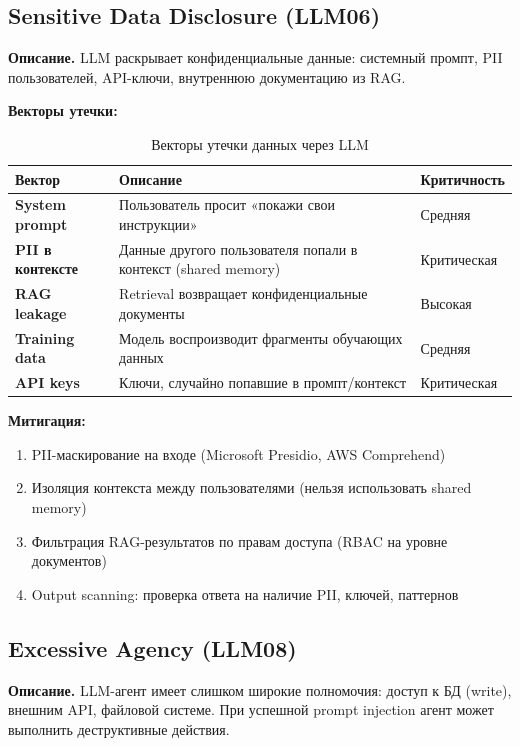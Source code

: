 \documentclass[12pt,a4paper]{article}
\begin{document}
\subsection{Sensitive Data Disclosure (LLM06)}

\textbf{Описание.} LLM раскрывает конфиденциальные данные: системный промпт, PII пользователей, API-ключи, внутреннюю документацию из RAG.

\textbf{Векторы утечки:}

\begin{table}[H]
\centering
\small
\begin{tabularx}{\textwidth}{>{\bfseries}l X l}
\toprule
Вектор & Описание & Критичность \\
\midrule
System prompt & Пользователь просит «покажи свои инструкции» & Средняя \\
PII в контексте & Данные другого пользователя попали в контекст (shared memory) & Критическая \\
RAG leakage & Retrieval возвращает конфиденциальные документы & Высокая \\
Training data & Модель воспроизводит фрагменты обучающих данных & Средняя \\
API keys & Ключи, случайно попавшие в промпт/контекст & Критическая \\
\bottomrule
\end{tabularx}
\caption{Векторы утечки данных через LLM}
\end{table}

\textbf{Митигация:}
\begin{enumerate}
  \item PII-маскирование на входе (Microsoft Presidio, AWS Comprehend)
  \item Изоляция контекста между пользователями (нельзя использовать shared memory)
  \item Фильтрация RAG-результатов по правам доступа (RBAC на уровне документов)
  \item Output scanning: проверка ответа на наличие PII, ключей, паттернов
\end{enumerate}

\subsection{Excessive Agency (LLM08)}

\textbf{Описание.} LLM-агент имеет слишком широкие полномочия: доступ к БД (write), внешним API, файловой системе. При успешной prompt injection агент может выполнить деструктивные действия.
\end{document}
